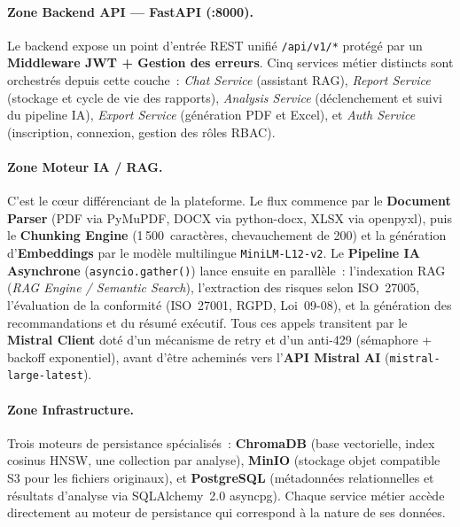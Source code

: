 \documentclass[a4paper,12pt,oneside]{report}
\begin{document}
	\paragraph{Zone Backend API --- FastAPI (:8000).}
	Le backend expose un point d'entr\'ee REST unifi\'e \texttt{/api/v1/*} prot\'eg\'e
	par un \textbf{Middleware JWT + Gestion des erreurs}.
	Cinq services m\'etier distincts sont orchestr\'es depuis cette couche~:
	\textit{Chat Service} (assistant RAG),
	\textit{Report Service} (stockage et cycle de vie des rapports),
	\textit{Analysis Service} (d\'eclenchement et suivi du pipeline IA),
	\textit{Export Service} (g\'en\'eration PDF et Excel),
	et \textit{Auth Service} (inscription, connexion, gestion des r\^oles RBAC).
	
	\paragraph{Zone Moteur IA / RAG.}
	C'est le c\oe{}ur diff\'erenciant de la plateforme.
	Le flux commence par le \textbf{Document Parser} (PDF via PyMuPDF, DOCX via
	python-docx, XLSX via openpyxl), puis le \textbf{Chunking Engine} (1\,500~caract\`eres,
	chevauchement de 200) et la g\'en\'eration d'\textbf{Embeddings} par le mod\`ele
	multilingue \texttt{MiniLM-L12-v2}.
	Le \textbf{Pipeline IA Asynchrone} (\texttt{asyncio.gather()}) lance ensuite en
	parall\`ele~: l'indexation RAG (\textit{RAG Engine / Semantic Search}),
	l'extraction des risques selon ISO~27005, l'\'evaluation de la conformit\'e
	(ISO~27001, RGPD, Loi~09-08), et la g\'en\'eration des recommandations
	et du r\'esum\'e ex\'ecutif.
	Tous ces appels transitent par le \textbf{Mistral Client} dot\'e d'un
	m\'ecanisme de retry et d'un anti-429 (s\'emaphore + backoff exponentiel),
	avant d'\^etre achemin\'es vers l'\textbf{API Mistral AI} (\texttt{mistral-large-latest}).
	
	\paragraph{Zone Infrastructure.}
	Trois moteurs de persistance sp\'ecialis\'es~:
	\textbf{ChromaDB} (base vectorielle, index cosinus HNSW, une collection par analyse),
	\textbf{MinIO} (stockage objet compatible S3 pour les fichiers originaux),
	et \textbf{PostgreSQL} (m\'etadonn\'ees relationnelles et r\'esultats d'analyse via
	SQLAlchemy~2.0 asyncpg).
	Chaque service m\'etier acc\`ede directement au moteur de persistance
	qui correspond \`a la nature de ses donn\'ees.
	
\end{document}
